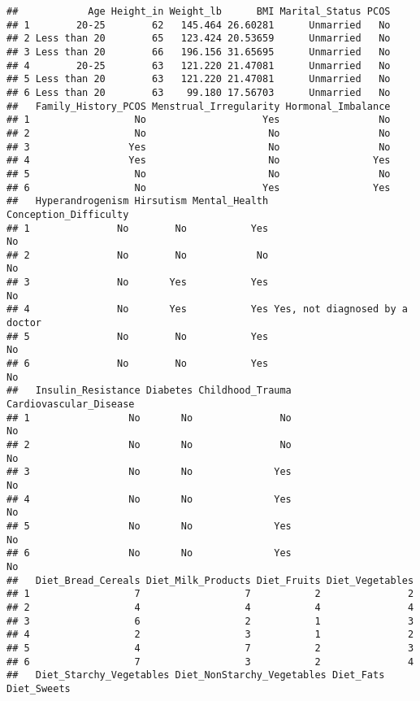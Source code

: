 \documentclass[
]{article}
\begin{document}
\begin{verbatim}
##            Age Height_in Weight_lb      BMI Marital_Status PCOS
## 1        20-25        62   145.464 26.60281      Unmarried   No
## 2 Less than 20        65   123.424 20.53659      Unmarried   No
## 3 Less than 20        66   196.156 31.65695      Unmarried   No
## 4        20-25        63   121.220 21.47081      Unmarried   No
## 5 Less than 20        63   121.220 21.47081      Unmarried   No
## 6 Less than 20        63    99.180 17.56703      Unmarried   No
##   Family_History_PCOS Menstrual_Irregularity Hormonal_Imbalance
## 1                  No                    Yes                 No
## 2                  No                     No                 No
## 3                 Yes                     No                 No
## 4                 Yes                     No                Yes
## 5                  No                     No                 No
## 6                  No                    Yes                Yes
##   Hyperandrogenism Hirsutism Mental_Health          Conception_Difficulty
## 1               No        No           Yes                             No
## 2               No        No            No                             No
## 3               No       Yes           Yes                             No
## 4               No       Yes           Yes Yes, not diagnosed by a doctor
## 5               No        No           Yes                             No
## 6               No        No           Yes                             No
##   Insulin_Resistance Diabetes Childhood_Trauma Cardiovascular_Disease
## 1                 No       No               No                     No
## 2                 No       No               No                     No
## 3                 No       No              Yes                     No
## 4                 No       No              Yes                     No
## 5                 No       No              Yes                     No
## 6                 No       No              Yes                     No
##   Diet_Bread_Cereals Diet_Milk_Products Diet_Fruits Diet_Vegetables
## 1                  7                  7           2               2
## 2                  4                  4           4               4
## 3                  6                  2           1               3
## 4                  2                  3           1               2
## 5                  4                  7           2               3
## 6                  7                  3           2               4
##   Diet_Starchy_Vegetables Diet_NonStarchy_Vegetables Diet_Fats Diet_Sweets

\end{verbatim}
\end{document}
